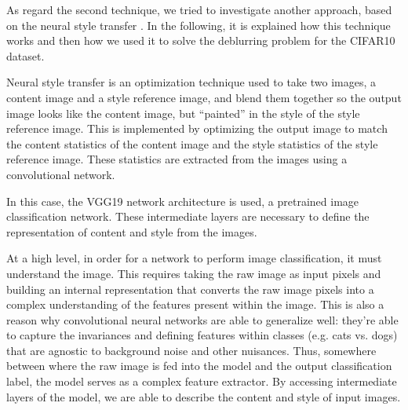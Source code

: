 
As regard the second technique, we tried to investigate another approach, based on the neural style transfer \cite{G&E&B}. In the following, it is explained how this technique works and then how we used it to solve the deblurring problem for the CIFAR10 dataset.

Neural style transfer is an optimization technique used to take two images, a content image and a style reference image, and blend them together so the output image looks like the content image, but “painted” in the style of the style reference image.
This is implemented by optimizing the output image to match the content statistics of the content image and the style statistics of the style reference image. These statistics are extracted from the images using a convolutional network.

In this case, the VGG19 network architecture is used, a pretrained image classification network. These intermediate layers are necessary to define the representation of content and style from the images.

At a high level, in order for a network to perform image classification, it must understand the image. This requires taking the raw image as input pixels and building an internal representation that converts the raw image pixels into a complex understanding of the features present within the image. This is also a reason why convolutional neural networks are able to generalize well: they’re able to capture the invariances and defining features within classes (e.g. cats vs. dogs) that are agnostic to background noise and other nuisances. Thus, somewhere between where the raw image is fed into the model and the output classification label, the model serves as a complex feature extractor. By accessing intermediate layers of the model, we are able to describe the content and style of input images.

